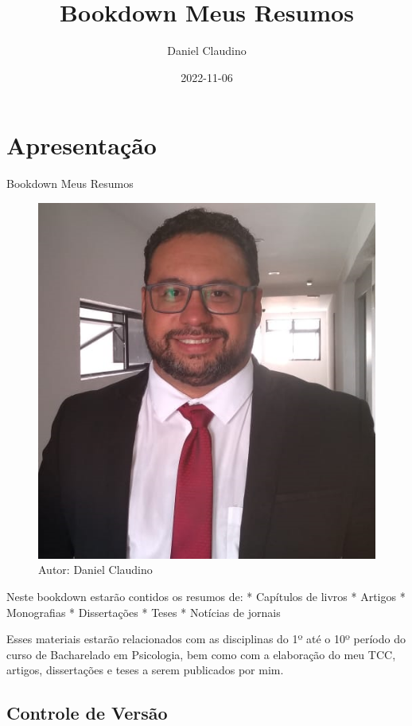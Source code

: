 \documentclass[
]{book}
\title{Bookdown Meus Resumos}
\author{Daniel Claudino}
\date{2022-11-06}
\begin{document}
\maketitle

{
\setcounter{tocdepth}{1}
\tableofcontents
}
\hypertarget{apresentauxe7uxe3o}{%
\chapter{Apresentação}\label{apresentauxe7uxe3o}}

Bookdown Meus Resumos

\begin{figure}

{\centering \includegraphics[width=0.5\linewidth]{imagens/FOTO-PERFIL-DANIEL-CLAUDINO-2020} 

}

\caption{Autor: Daniel Claudino}\label{fig:unnamed-chunk-1}
\end{figure}

Neste bookdown estarão contidos os resumos de:
* Capítulos de livros
* Artigos
* Monografias
* Dissertações
* Teses
* Notícias de jornais

Esses materiais estarão relacionados com as disciplinas do 1º até o 10º período do curso de Bacharelado em Psicologia, bem como com a elaboração do meu TCC, artigos, dissertações e teses a serem publicados por mim.

\hypertarget{controle-de-versuxe3o}{%
\section{Controle de Versão}\label{controle-de-versuxe3o}}
\end{document}
